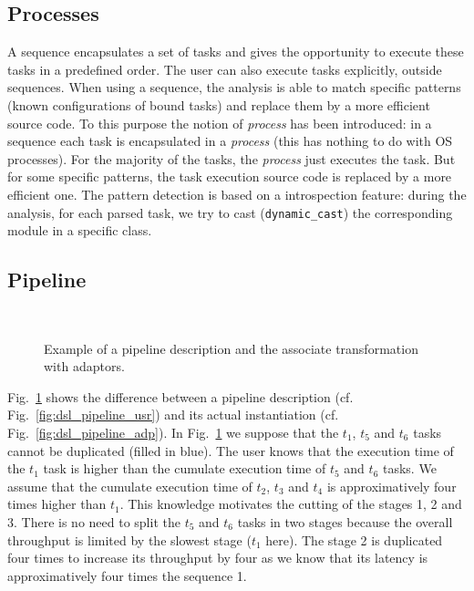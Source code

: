 \subsection{Processes}

A sequence encapsulates a set of tasks and gives the opportunity to execute
these tasks in a predefined order. The user can also execute tasks explicitly,
outside sequences. When using a sequence, the analysis is able to match specific
patterns (known configurations of bound tasks) and replace them by a more
efficient source code. To this purpose the notion of \emph{process} has been
introduced: in a sequence each task is encapsulated in a \emph{process} (this
has nothing to do with OS processes). For the majority of the tasks, the
\emph{process} just executes the task. But for some specific patterns, the task
execution source code is replaced by a more efficient one. The pattern detection
is based on a \Cxx introspection feature: during the analysis, for each parsed
task, we try to cast (\verb|dynamic_cast|) the corresponding module in a
specific class.

\subsection{Pipeline}

\begin{figure}[htp]
  \centering
  \\
  \caption{Example of a pipeline description and the associate transformation
    with adaptors.}
  \label{fig:dsl_pipeline}
\end{figure}

Fig.~\ref{fig:dsl_pipeline} shows the difference between a pipeline description
(cf. Fig.~\ref{fig:dsl_pipeline_usr}) and its actual instantiation (cf.
Fig.~\ref{fig:dsl_pipeline_adp}). In Fig.~\ref{fig:dsl_pipeline} we suppose
that the $t_1$, $t_5$ and $t_6$ tasks cannot be duplicated (filled in blue). The
user knows that the execution time of the $t_1$ task is higher than the cumulate
execution time of $t_5$ and $t_6$ tasks. We assume that the cumulate execution
time of $t_2$, $t_3$ and $t_4$ is approximatively four times higher than $t_1$.
This knowledge motivates the cutting of the stages 1, 2 and 3. There is no
need to split the $t_5$ and $t_6$ tasks in two stages because the overall
throughput is limited by the slowest stage ($t_1$ here). The stage 2 is
duplicated four times to increase its throughput by four as we know that its
latency is approximatively four times the sequence 1.

